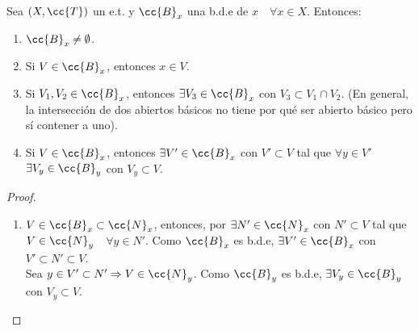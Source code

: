 \begin{prop}
    Sea $(X,\cc{T})$ un e.t. y $\cc{B}_x$ una b.d.e de $x$\ \ $\forall x \in X$. Entonces:
    \begin{enumerate}
        \item[\objetivo{V1}] $\cc{B}_x\neq \emptyset$.
        \item[\objetivo{V2}] Si $V\in \cc{B}_x$, entonces $x\in V$. %
        \item[\objetivo{V3}] Si $V_1, V_2\in \cc{B}_x$, entonces $\exists V_3 \in \cc{B}_x$ con $V_3 \subset V_1 \cap V_2$. (En general, la intersección de dos abiertos básicos no tiene por qué ser abierto básico pero sí contener a uno).
        \item[\objetivo{V4}] Si $V\in \cc{B}_x$, entonces $\exists V'\in \cc{B}_x$ con $V'\subset V$ tal que $\forall y\in V'$\ \ $\exists V_y\in \cc{B}_y$ con $V_y\subset V$.
    \end{enumerate}

    \begin{center}
    \end{center}
    
    \begin{proof}\
        \begin{enumerate}
            \item[\apuntar{V4}] $V\in \cc{B}_x\subset \cc{N}_x$, entonces, por  $\exists N'\in \cc{N}_x$ con $N'\subset V$ tal que $V \in \cc{N}_y$\ \ $\forall y \in N'$. Como $\cc{B}_x$ es b.d.e, $\exists V'\in \cc{B}_x$ con $V'\subset N'\subset V$.\\
            
            Sea $y\in V'\subset N'\Rightarrow V\in \cc{N}_y$. Como $\cc{B}_y$ es b.d.e, $\exists V_y \in \cc{B}_y$ con $V_y \subset V$.
        \end{enumerate}
    \end{proof}
\end{prop}

